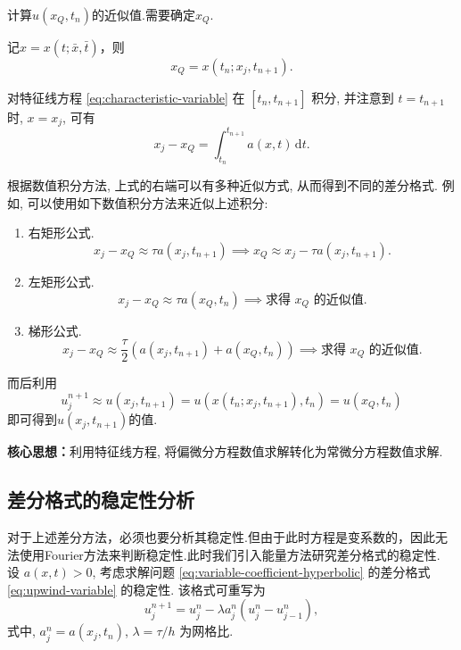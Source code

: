 \noindent{} 计算$u(x_Q,t_n)$的近似值.需要确定$x_Q$.\par
记$x=x(t;\bar{x},\bar{t})$，则
\begin{equation*}
    x_Q=x(t_n; x_j, t_{n+1}).
\end{equation*}

对特征线方程 \eqref{eq:characteristic-variable} 在 $[t_n, t_{n+1}]$ 积分, 并注意到 $t = t_{n+1}$ 时, $x = x_j$, 可有
\begin{equation*}
    x_j - x_Q = \int_{t_n}^{t_{n+1}} a(x,t) \,\mathrm{d}t.
\end{equation*}

根据数值积分方法, 上式的右端可以有多种近似方式, 从而得到不同的差分格式. 例如, 可以使用如下数值积分方法来近似上述积分:
\begin{enumerate}[(1)]
    \item 右矩形公式.
    \begin{equation*}
        x_j - x_Q \approx \tau a(x_j, t_{n+1}) \implies x_Q \approx x_j - \tau a(x_j, t_{n+1}).
    \end{equation*}
    \item 左矩形公式.
    \begin{equation*}
        x_j - x_Q \approx \tau a(x_Q, t_n) \implies \text{求得 } x_Q \text{ 的近似值.}
    \end{equation*}
    \item 梯形公式.
    \begin{equation*}
        x_j - x_Q \approx \frac{\tau}{2}(a(x_j, t_{n+1}) + a(x_Q, t_n)) \implies \text{求得 } x_Q \text{ 的近似值.}
    \end{equation*}
\end{enumerate}
而后利用
\begin{equation}
    u_j^{n+1} \approx u(x_j, t_{n+1}) = u(x(t_n; x_j, t_{n+1}), t_n)=u(x_Q, t_n)
\end{equation}
即可得到$u(x_j,t_{n+1})$的值.

\textbf{核心思想：}利用特征线方程, 将偏微分方程数值求解转化为常微分方程数值求解.

\subsection{差分格式的稳定性分析}

对于上述差分方法，必须也要分析其稳定性.但由于此时方程是变系数的，因此无法使用Fourier方法来判断稳定性.此时我们引入能量方法研究差分格式的稳定性. 设 $a(x,t) > 0$, 考虑求解问题 \eqref{eq:variable-coefficient-hyperbolic} 的差分格式 \eqref{eq:upwind-variable} 的稳定性. 该格式可重写为
\begin{equation}\label{eq:变系数迎风化简}
    u_j^{n+1} = u_j^n - \lambda a_j^n(u_j^n - u_{j-1}^n),
\end{equation}
式中, $a_j^n = a(x_j, t_n)$, $\lambda = \tau/h$ 为网格比.

